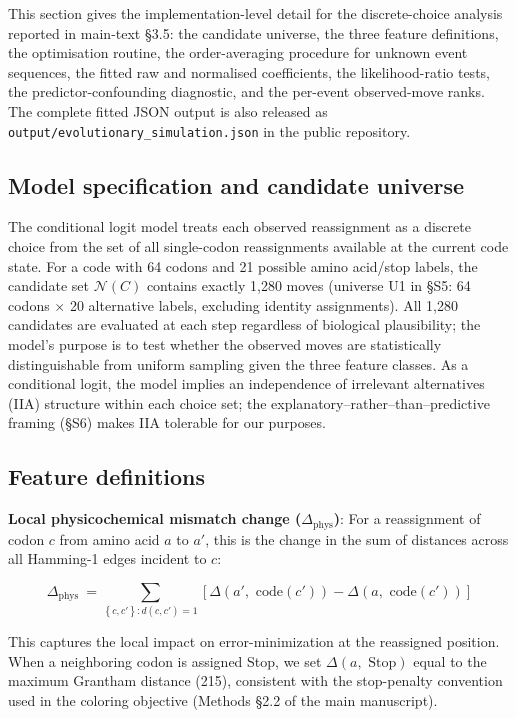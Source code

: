 \documentclass[preprint,11pt,authoryear,a4paper]{elsarticle}
\begin{document}
This section gives the implementation-level detail for the
discrete-choice analysis reported in main-text §3.5: the candidate
universe, the three feature definitions, the optimisation routine, the
order-averaging procedure for unknown event sequences, the fitted raw
and normalised coefficients, the likelihood-ratio tests, the
predictor-confounding diagnostic, and the per-event observed-move ranks.
The complete fitted JSON output is also released as
\texttt{output/evolutionary\_simulation.json} in the public repository.

\subsection{Model specification and candidate universe}

The conditional logit model treats each observed reassignment as a
discrete choice from the set of all single-codon reassignments available
at the current code state. For a code with 64 codons and 21 possible
amino acid/stop labels, the candidate set \(\mathcal{N}(C)\) contains
exactly 1,280 moves (universe U1 in §S5: 64 codons \(\times\) 20
alternative labels, excluding identity assignments). All 1,280
candidates are evaluated at each step regardless of biological
plausibility; the model's purpose is to test whether the observed moves
are statistically distinguishable from uniform sampling given the three
feature classes. As a conditional logit, the model implies an
independence of irrelevant alternatives (IIA) structure within each
choice set; the explanatory--rather--than--predictive framing (§S6)
makes IIA tolerable for our purposes.

\subsection{Feature definitions}

\textbf{Local physicochemical mismatch change
(\(\Delta_{\text{phys}}\))}: For a reassignment of codon \(c\) from
amino acid \(a\) to \(a'\), this is the change in the sum of
\citep{grantham1974} distances across all Hamming-1 edges incident to
\(c\):

\[\Delta_{\text{phys }} = \sum_{\left\{ c,c' \right\}:d(c,c') = 1}\left\lbrack \Delta(a',\text{ code}(c')) - \Delta(a,\text{ code}(c')) \right\rbrack\]

This captures the local impact on error-minimization at the reassigned
position. When a neighboring codon is assigned Stop, we set
\(\Delta(a,\text{ Stop})\) equal to the maximum Grantham distance (215),
consistent with the stop-penalty convention used in the coloring
objective (Methods §2.2 of the main manuscript).
\end{document}
